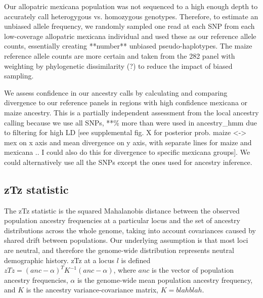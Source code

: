 \documentclass[12pt]{report}
\begin{document}
Our allopatric mexicana population was not sequenced to a high enough depth to accurately call heterogygous vs. homozygous genotypes. Therefore, to estimate an unbiased allele frequency, we randomly sampled one read at each SNP from each low-coverage allopatric mexicana individual and used these as our reference allele counts, essentially creating **number** unbiased pseudo-haplotypes. The maize reference allele counts are more certain and taken from the 282 panel with weighting by phylogenetic dissimilarity (?) to reduce the impact of biased sampling.\par

We assess confidence in our ancestry calls by calculating and comparing divergence to our reference panels in regions with high confidence mexicana or maize ancestry. This is a partially independent assessment from the local ancestry calling because we use all SNPs, **\% more than were used in ancestry\_hmm due to filtering for high LD [see supplemental fig. X for posterior prob. maize <-> mex on x axis and mean divergence on y axis, with separate lines for maize and mexicana .. I could also do this for divergence to specific mexicana groups]. We could alternatively use all the SNPs except the ones used for ancestry inference. \par

\subsection{zTz statistic}
The zTz statistic is the squared Mahalanobis distance between the observed population ancestry frequencies at a particular locus and the set of ancestry distributions across the whole genome, taking into account covariances caused by shared drift between populations. Our underlying assumption is that most loci are neutral, and therefore the genome-wide distribution represents neutral demographic history. zTz at a locus $l$ is defined 
$zTz=(anc - \alpha)^{T}K^{-1}(anc - \alpha)$,
where $anc$ is the vector of population ancestry frequencies, $\alpha$ is the genome-wide mean population ancestry frequency, and $K$ is the ancestry variance-covariance matrix,
$K = blah blah$.
\end{document}
